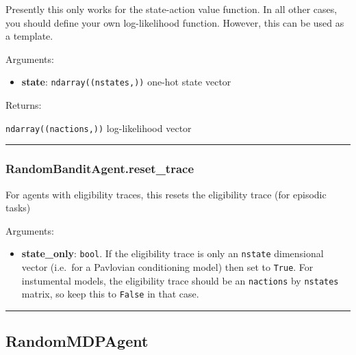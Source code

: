 Presently this only works for the state-action value function. In all
other cases, you should define your own log-likelihood function.
However, this can be used as a template.

Arguments:

\begin{itemize}
\tightlist
\item
  \textbf{state}: \texttt{ndarray((nstates,))} one-hot state vector
\end{itemize}

Returns:

\texttt{ndarray((nactions,))} log-likelihood vector

\begin{center}\rule{0.5\linewidth}{\linethickness}\end{center}

\subsubsection{RandomBanditAgent.reset\_trace}\label{randombanditagent.reset_trace}

\begin{Shaded}
\begin{Highlighting}[]
\OperatorTok{=}\NormalTok{)}
\end{Highlighting}
\end{Shaded}

For agents with eligibility traces, this resets the eligibility trace
(for episodic tasks)

Arguments:

\begin{itemize}
\tightlist
\item
  \textbf{state\_only}: \texttt{bool}. If the eligibility trace is only
  an \texttt{nstate} dimensional vector (i.e.~for a Pavlovian
  conditioning model) then set to \texttt{True}. For instumental models,
  the eligibility trace should be an \texttt{nactions} by
  \texttt{nstates} matrix, so keep this to \texttt{False} in that case.
\end{itemize}

\begin{center}\rule{0.5\linewidth}{\linethickness}\end{center}

\subsection{RandomMDPAgent}\label{randommdpagent}

